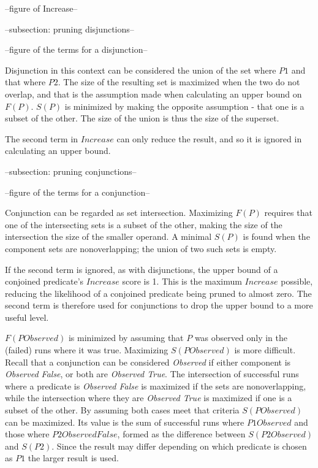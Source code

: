 --figure of Increase--

--subsection: pruning disjunctions--

--figure of the terms for a disjunction--

Disjunction in this context can be considered the union of the set where $P1$ and that where $P2$.  The size of the resulting set is maximized when the two do not overlap, and that is the assumption made when calculating an upper bound on $F(P)$.  $S(P)$ is minimized by making the opposite assumption - that one is a subset of the other.  The size of the union is thus the size of the superset.

The second term in $Increase$ can only reduce the result, and so it is ignored in calculating an upper bound.

--subsection: pruning conjunctions--

--figure of the terms for a conjunction--

Conjunction can be regarded as set intersection.  Maximizing $F(P)$ requires that one of the intersecting sets is a subset of the other, making the size of the intersection the size of the smaller operand.  A minimal $S(P)$ is found when the component sets are nonoverlapping; the union of two such sets is empty.

If the second term is ignored, as with disjunctions, the upper bound of a conjoined predicate's $Increase$ score is 1.  This is the maximum $Increase$ possible, reducing the likelihood of a conjoined predicate being pruned to almost zero.  The second term is therefore used for conjunctions to drop the upper bound to a more useful level.

$F(P Observed)$ is minimized by assuming that $P$ was observed only in the (failed) runs where it was true.  Maximizing $S(P Observed)$ is more difficult.  Recall that a conjunction can be considered \textit{Observed} if either component is \textit{Observed False}, or both are \textit{Observed True}.  The intersection of successful runs where a predicate is \textit{Observed False} is maximized if the sets are nonoverlapping, while the intersection where they are \textit{Observed True} is maximized if one is a subset of the other.  By assuming both cases meet that criteria $S(P Observed)$ can be maximized.  Its value is the sum of successful runs where $P1 Observed$ and those where $P2 Observed False$, formed as the difference between $S(P2 Observed)$ and $S(P2)$.  Since the result may differ depending on which predicate is chosen as $P1$ the larger result is used.
